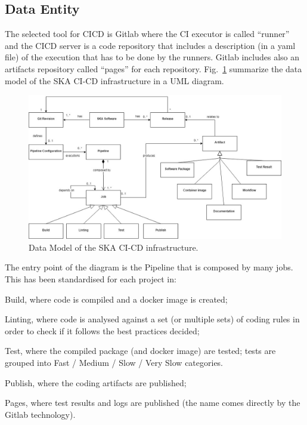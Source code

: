 \documentclass[a4paper,
               keeplastbox,   %
               ]{jacow}
\begin{document}
\subsection{Data Entity}
The selected tool for CICD is Gitlab where the CI executor is called “runner” and the CICD server is a code repository that includes a description (in a yaml file) of the execution that has to be done by the runners. Gitlab includes also an artifacts repository called “pages” for each repository. Fig.~\ref{fig:datamodel} summarize the data model of the SKA CI-CD infrastructure in a UML diagram.
\begin{figure}[!htb]
   \centering
   \includegraphics*[width=1\columnwidth]{dataEntity}
   \caption{Data Model of the SKA CI-CD infrastructure.}
   \label{fig:datamodel}
\end{figure}

The entry point of the diagram is the Pipeline that is composed by many jobs. This has been standardised for each project in:
\begin{Itemize}
    \item Build, where code is compiled and a docker image is created;
    \item Linting, where code is analysed against a set (or multiple sets) of coding rules in order to check if it follows the best practices decided;
    \item Test, where the compiled package (and docker image) are tested; tests are grouped into Fast / Medium / Slow / Very Slow categories.
    \item Publish, where the coding artifacts are published;
    \item Pages, where test results and logs are published (the name comes directly by the Gitlab technology). 
\end{Itemize}
\end{document}
